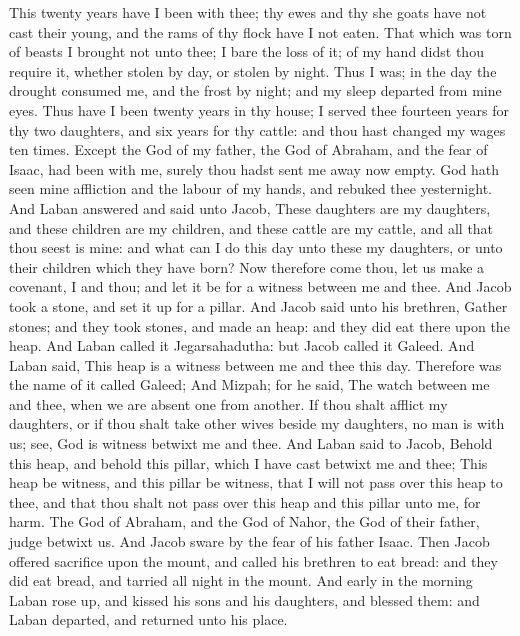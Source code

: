 \begin{biblechapter}
\verse This twenty years have I been with thee; thy ewes and thy she goats have not cast their young, and the rams of thy flock have I not eaten.
\verse That which was torn of beasts I brought not unto thee; I bare the loss of it; of my hand didst thou require it, whether stolen by day, or stolen by night.
\verse Thus I was; in the day the drought consumed me, and the frost by night; and my sleep departed from mine eyes.
\verse Thus have I been twenty years in thy house; I served thee fourteen years for thy two daughters, and six years for thy cattle: and thou hast changed my wages ten times.
\verse Except the God of my father, the God of Abraham, and the fear of Isaac, had been with me, surely thou hadst sent me away now empty. God hath seen mine affliction and the labour of my hands, and rebuked thee yesternight.
\verse And Laban answered and said unto Jacob, These daughters are my daughters, and these children are my children, and these cattle are my cattle, and all that thou seest is mine: and what can I do this day unto these my daughters, or unto their children which they have born?
\verse Now therefore come thou, let us make a covenant, I and thou; and let it be for a witness between me and thee.
\verse And Jacob took a stone, and set it up for a pillar.
\verse And Jacob said unto his brethren, Gather stones; and they took stones, and made an heap: and they did eat there upon the heap.
\verse And Laban called it Jegarsahadutha: but Jacob called it Galeed.
\verse And Laban said, This heap is a witness between me and thee this day. Therefore was the name of it called Galeed;
\verse And Mizpah; for he said, The \LORD watch between me and thee, when we are absent one from another.
\verse If thou shalt afflict my daughters, or if thou shalt take other wives beside my daughters, no man is with us; see, God is witness betwixt me and thee.
\verse And Laban said to Jacob, Behold this heap, and behold this pillar, which I have cast betwixt me and thee;
\verse This heap be witness, and this pillar be witness, that I will not pass over this heap to thee, and that thou shalt not pass over this heap and this pillar unto me, for harm.
\verse The God of Abraham, and the God of Nahor, the God of their father, judge betwixt us. And Jacob sware by the fear of his father Isaac.
\verse Then Jacob offered sacrifice upon the mount, and called his brethren to eat bread: and they did eat bread, and tarried all night in the mount.
\verse And early in the morning Laban rose up, and kissed his sons and his daughters, and blessed them: and Laban departed, and returned unto his place.
\end{biblechapter}

